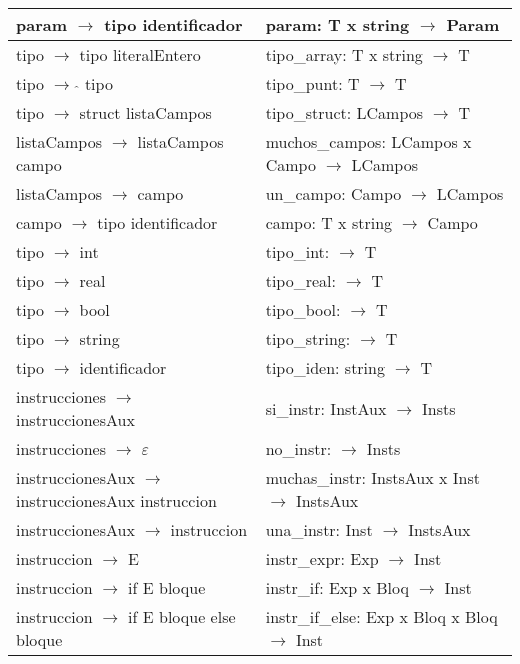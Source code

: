 \documentclass[11pt]{article}
\begin{document}
\begin{center}
\begin{longtable}{|p{7cm}|p{7cm}|}
        \hline
        param $\rightarrow$ tipo identificador & param: T x string $\rightarrow$ Param \\
        \hline
        tipo $\rightarrow$ tipo literalEntero & tipo\_array: T x string $\rightarrow$ T \\
        \hline
        tipo $\rightarrow$ $\hat{}$ tipo & tipo\_punt: T $\rightarrow$ T \\
        \hline
        tipo $\rightarrow$ struct listaCampos & tipo\_struct: LCampos $\rightarrow$ T \\
        \hline
        listaCampos $\rightarrow$ listaCampos campo & muchos\_campos: LCampos x Campo $\rightarrow$ LCampos \\
        \hline
        listaCampos $\rightarrow$ campo & un\_campo: Campo $\rightarrow$ LCampos \\
        \hline
        campo $\rightarrow$ tipo identificador & campo: T x string $\rightarrow$ Campo \\
        \hline
        tipo $\rightarrow$ int & tipo\_int: $\rightarrow$ T \\
        \hline
        tipo $\rightarrow$ real & tipo\_real: $\rightarrow$ T \\
        \hline
        tipo $\rightarrow$ bool & tipo\_bool: $\rightarrow$ T \\
        \hline
        tipo $\rightarrow$ string & tipo\_string: $\rightarrow$ T \\
        \hline
        tipo $\rightarrow$ identificador & tipo\_iden: string $\rightarrow$ T \\
        \hline
        instrucciones $\rightarrow$ instruccionesAux & si\_instr: InstAux $\rightarrow$ Insts \\
        \hline
        instrucciones $\rightarrow$ $\varepsilon$ & no\_instr: $\rightarrow$ Insts \\
        \hline
        instruccionesAux $\rightarrow$ instruccionesAux instruccion & muchas\_instr: InstsAux x Inst $\rightarrow$ InstsAux \\
        \hline
        instruccionesAux $\rightarrow$ instruccion & una\_instr: Inst $\rightarrow$ InstsAux \\
        \hline
        instruccion $\rightarrow$ E & instr\_expr: Exp $\rightarrow$ Inst \\
        \hline
        instruccion $\rightarrow$ if E bloque & instr\_if: Exp x Bloq $\rightarrow$ Inst \\
        \hline
        instruccion $\rightarrow$ if E bloque else bloque & instr\_if\_else: Exp x Bloq x Bloq $\rightarrow$ Inst \\

\end{longtable}
\end{center}
\end{document}
